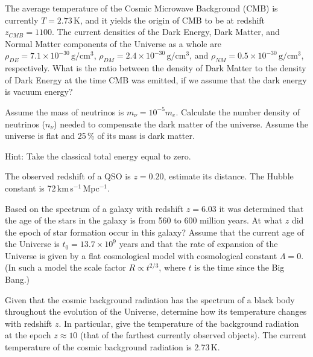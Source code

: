 The average temperature of the Cosmic Microwave Background (CMB) is currently
$T = 2.73$\,K, and it yields the origin of CMB to be at redshift
$z_{CMB} = 1100$. The current densities of the Dark Energy, Dark Matter, and
Normal Matter components of the Universe as a whole are
$\rho_{DE} = 7.1 \times 10^{-30}\,\mathrm{g/cm^3}$,
$\rho_{DM} = 2.4 \times 10^{-30}\,\mathrm{g/cm^3}$, and
$\rho_{NM} = 0.5 \times 10^{-30}\,\mathrm{g/cm^3}$, respectively. What is the
ratio between the density of Dark Matter to the density of Dark Energy at the
time CMB was emitted, if we assume that the dark energy is vacuum energy?

Assume the mass of neutrinos is $m_\nu = 10^{-5}m_e$. Calculate the number
density of neutrinos ($n_\nu$) needed to compensate the dark matter of the
universe. Assume the universe is flat and 25\,\% of its mass is dark matter.

Hint: Take the classical total energy equal to zero.

The observed redshift of a QSO is $z = 0.20$, estimate its distance. The
Hubble constant is 72\,km\,s$^{-1}$\,Mpc$^{-1}$.

Based on the spectrum of a galaxy with redshift $z = 6.03$ it was determined
that the age of the stars in the galaxy is from 560 to 600 million years. At
what $z$ did the epoch of star formation occur in this galaxy? Assume that the
current age of the Universe is $t_0 = 13.7 \times 10^{9}$ years and that the
rate of expansion of the Universe is given by a flat cosmological model with
cosmological constant $\Lambda = 0$. (In such a model the scale factor
$R \propto t^{2/3}$, where $t$ is the time since the Big Bang.)

Given that the cosmic background radiation has the spectrum of a black body
throughout the evolution of the Universe, determine how its temperature
changes with redshift $z$. In particular, give the temperature of the
background radiation at the epoch $z \approx 10$ (that of the farthest
currently observed objects). The current temperature of the cosmic background
radiation is 2.73\,K.

